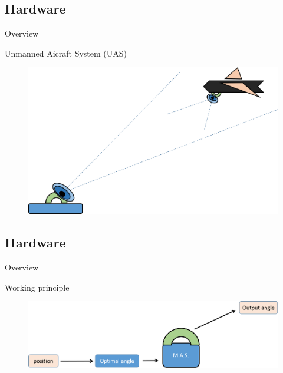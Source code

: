 \subsection{Hardware}

\begin{frame}{Overview}{}
  \begin{block}{Unmanned Aicraft System (UAS)}
    
   \begin{figure}[H]
\centerline{
\includegraphics[scale=0.35]{figures/overview.png}}
\label{fig:overview}
\end{figure}

    
  \end{block}
\end{frame}

\subsection{Hardware}

\begin{frame}{Overview}{}
  \begin{block}{Working principle}
    
   \begin{figure}[H]
\centerline{
\includegraphics[scale=0.35]{figures/overview2.png}}
\label{fig:overview2}
\end{figure}

    
  \end{block}
\end{frame}

